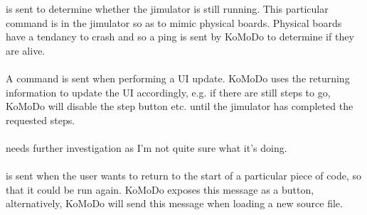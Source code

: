 %
%
 is sent to determine whether the jimulator is still running. This particular command is in the jimulator so as to mimic physical boards. Physical boards have a tendancy to crash and so a ping is sent by KoMoDo to determine if they are alive.\\\\
%
A  command is sent when performing a UI update. KoMoDo uses the returning information to update the UI accordingly, e.g. if there are still steps to go, KoMoDo will disable the step button etc. until the jimulator has completed the requested steps.\\\\
%
 needs further investigation as I'm not quite sure what it's doing.\\\\ 
%
%
%
%
 is sent when the user wants to return to the start of a particular piece of code, so that it could be run again. KoMoDo exposes this message as a button, alternatively, KoMoDo will send this message when loading a new source file.\\\\
